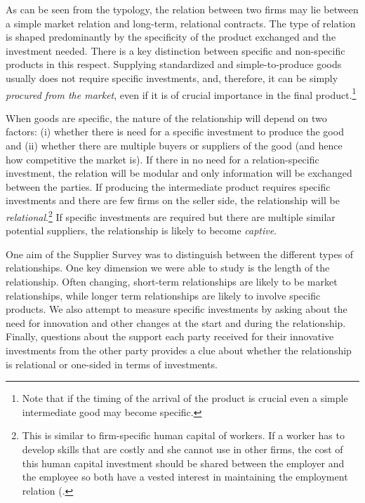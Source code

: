 \documentclass[final, dvipsnames, authoryear,12pt]{elsarticle}
\begin{document}
As can be seen from the typology, the relation between two firms may lie between a simple market relation and long-term, relational contracts. The type of relation is shaped predominantly by the specificity of the product exchanged and the investment needed. There is a key distinction between specific and non-specific products in this respect. Supplying standardized and simple-to-produce goods usually does not require specific investments, and, therefore, it can be simply \textit{procured from the market}, even if it is of crucial importance in the final product.\footnote{Note that if the timing of the arrival of the product is crucial even a simple intermediate good may become specific.} 

When goods are specific, the nature of the relationship will depend on two factors: (i) whether there is need for a specific investment to produce the good and (ii) whether there are multiple buyers or suppliers of the good (and hence how competitive the market is). If there in no need for a relation-specific investment, the relation will be modular and only information will be exchanged between the parties. If producing the intermediate product requires specific investments and there are few firms on the seller side, the relationship will be \textit{relational}.\footnote{This is similar to firm-specific human capital of workers. If a worker has to develop skills that are costly and she cannot use in other firms, the cost of this human capital investment should be shared between the employer and the employee so both have a vested interest in maintaining the employment relation (\cite{becker1962investment}.} If specific investments are required but there are multiple similar potential suppliers, the relationship is likely to become \textit{captive}.

One aim of the Supplier Survey was to distinguish between the different types of relationships. One key dimension we were able to study is the length of the relationship. Often changing, short-term relationships are likely to be market relationships, while longer term relationships are likely to involve specific products. We also attempt to measure specific investments by asking about the need for innovation and other changes at the start and during the relationship. Finally, questions about the support each party received for their innovative investments from the other party provides a clue about whether the relationship is relational or one-sided in terms of investments. 

    
\end{document}
